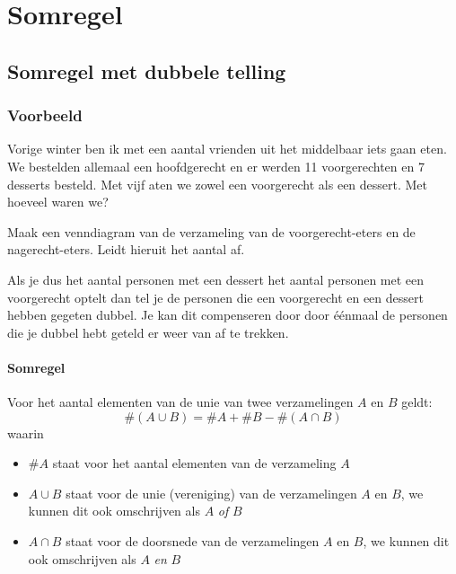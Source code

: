 \documentclass[12pt,twoside]{article}
\begin{document}
\section{Somregel}

\subsection{Somregel met dubbele telling}

\subsubsection*{Voorbeeld}

Vorige winter ben ik met een aantal vrienden uit het middelbaar iets gaan eten. We bestelden allemaal een hoofdgerecht en er werden 11 voorgerechten en 7 desserts besteld. Met vijf aten we zowel een voorgerecht als een dessert. Met hoeveel waren we?

\begin{oefening}
Maak een venndiagram van de verzameling van de voorgerecht-eters en de nagerecht-eters. Leidt hieruit het aantal af.
\vspace*{4cm}
\end{oefening}

Als je dus het aantal personen met een dessert het aantal personen met een voorgerecht optelt dan tel je de personen die een voorgerecht en een dessert hebben gegeten dubbel. Je kan dit compenseren door door éénmaal de personen die je dubbel hebt geteld er weer van af te trekken.

\paragraph*{Somregel}
\begin{mdframed}
Voor het aantal elementen van de unie van twee verzamelingen $A$ en $B$ geldt:
$$\#(A\cup B) = \#A + \#B - \#(A\cap B)$$
waarin
\begin{itemize}
  \item $\#A$ staat voor het aantal elementen van de verzameling $A$
  \item $A\cup B$ staat voor de unie (vereniging) van de verzamelingen $A$ en $B$, we kunnen dit ook omschrijven als $A$ {\em of} $B$
  \item $A\cap B$ staat voor de doorsnede van de verzamelingen $A$ en $B$, we kunnen dit ook omschrijven als $A$ {\em en} $B$
\end{itemize}
\end{mdframed}
\end{document}
